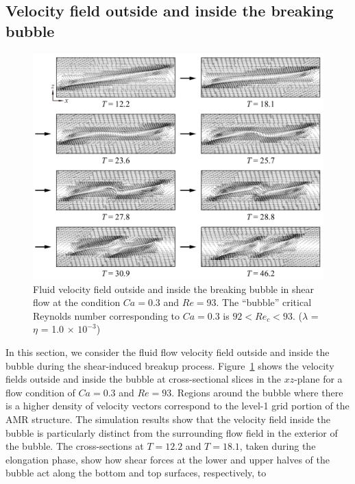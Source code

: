\documentclass[%
 reprint,
 showkeys,
 amsmath,amssymb,
 aps,
 prfluids,
 onecolumn
]{revtex4-2}
\begin{document}
\subsection{Velocity field outside and inside the breaking bubble}
%
\begin{figure}%
  \centering
  \includegraphics[width=\textwidth]{BubbleFieldCa0p3Re93}
  \caption{Fluid velocity field outside and inside the breaking bubble in
           shear flow at the condition $Ca=0.3$ and $Re=93$.
	   The ``bubble'' 
	   critical Reynolds number corresponding to $Ca=0.3$ is
	   $92<Re_{c}<93$.
           ($\lambda$ = $\eta$ = 1.0 $\times$ $10^{-3}$) 
	   }
  \label{fig:BubbleFieldCa0p3Re93}
\end{figure}
%
In this section, we consider the fluid flow velocity field outside and inside
the bubble during the shear-induced breakup process.
Figure~\ref{fig:BubbleFieldCa0p3Re93} shows the velocity fields outside and
inside the bubble at cross-sectional slices in the $xz$-plane for a flow
condition of $Ca = 0.3$ and $Re = 93$.  Regions around the bubble where there
is a higher density of velocity vectors correspond to the level-1 grid portion
of the AMR structure.  The simulation results show that the velocity field
inside the bubble is particularly distinct from the surrounding flow field in
the exterior of the bubble.  The cross-sections at $T=12.2$ and $T=18.1$, taken
during the elongation phase, show how shear forces at the lower and upper
halves of the bubble act along the bottom and top surfaces, respectively, to
\end{document}
